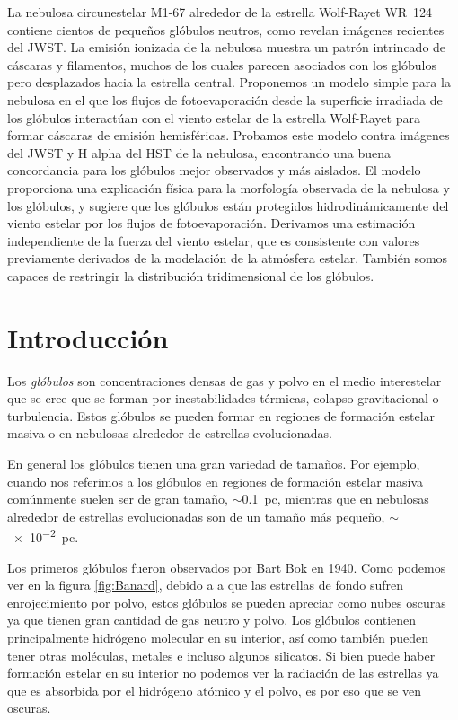 \documentclass{book}
\begin{document}
La nebulosa circunestelar M1-67 alrededor de la estrella Wolf-Rayet WR~124 contiene cientos de pequeños glóbulos neutros, como revelan imágenes recientes del JWST. La emisión ionizada de la nebulosa muestra un patrón intrincado de cáscaras y filamentos, muchos de los cuales parecen asociados con los glóbulos pero desplazados hacia la estrella central. Proponemos un modelo simple para la nebulosa en el que los flujos de fotoevaporación desde la superficie irradiada de los glóbulos interactúan con el viento estelar de la estrella Wolf-Rayet para formar cáscaras de emisión hemisféricas. Probamos este modelo contra imágenes del JWST y H alpha del HST de la nebulosa, encontrando una buena concordancia para los glóbulos mejor observados y más aislados. El modelo proporciona una explicación física para la morfología observada de la nebulosa y los glóbulos, y sugiere que los glóbulos están protegidos hidrodinámicamente del viento estelar por los flujos de fotoevaporación. Derivamos una estimación independiente de la fuerza del viento estelar, que es consistente con valores previamente derivados de la modelación de la atmósfera estelar. También somos capaces de restringir la distribución tridimensional de los glóbulos.

\newpage

\tableofcontents

\newpage

\chapter{Introducción}

Los \textit{glóbulos} son concentraciones densas de gas y polvo en el medio interestelar que se cree que se forman por inestabilidades térmicas, colapso gravitacional o turbulencia. Estos glóbulos se pueden formar en regiones de formación estelar masiva o en nebulosas alrededor de estrellas evolucionadas.

En general los glóbulos tienen una gran variedad de tamaños. Por ejemplo, cuando nos referimos a los glóbulos en regiones de formación estelar masiva comúnmente suelen ser de gran tamaño, $\sim$\SI{0.1}{pc}, mientras que en nebulosas alrededor de estrellas evolucionadas son de un tamaño más pequeño, $\sim$\SI{e-2}{pc}.

Los primeros glóbulos fueron observados por Bart Bok en 1940. Como podemos ver en la figura \ref{fig:Banard}, debido a a que las estrellas de fondo sufren enrojecimiento por polvo, estos glóbulos se pueden apreciar como nubes oscuras ya que tienen gran cantidad de gas neutro y polvo. Los glóbulos contienen principalmente hidrógeno molecular en su interior, así como también pueden tener otras moléculas, metales e incluso algunos silicatos. Si bien puede haber formación estelar en su interior no podemos ver la radiación de las estrellas ya que es absorbida por el hidrógeno atómico y el polvo, es por eso que se ven oscuras.
\end{document}
